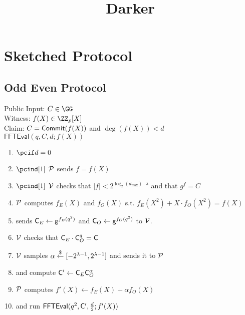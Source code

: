 \documentclass[12pt]{article}
\title{Darker}
\begin{document}
	
\maketitle
\section{Sketched Protocol}
\subsection{Odd Even Protocol}
\begin{mdframed}
Public Input: $C\in \GG$\\
Witness: $f(X) \in \ZZ_p[X]$ \\
Claim: $C=\textsf{{Commit}}(f(X))$ and $\deg(f(X))<d$	\\
$\textsf{FFTEval}(q,C,d;f(X))$
\begin{enumerate}[nolistsep]
		\item $\pcif d=0$
		\item $\pcind[1]$ $\mathcal{P}$ sends $f=f(X)$
		\item $\pcind[1]$ $\mathcal{V}$ checks that $|f|<2^{\log_2(d_{\max}) \cdot \lambda}$ and that $g^f=C$ 
		\item $\mathcal{P}$ computes $f_E(X)$ and $f_O(X)$ s.t. $f_E(X^2)+X \cdot f_O(X^2)=f(X)$ 
		\item \prover sends $\mathsf{C}_E\gets \mathsf{g}^{f_E(q^2)}$ and $\mathsf{C}_O\gets \mathsf{g}^{f_O(q^2)}$ to $\mathcal{V}$.
		\item $\mathcal{V}$ checks that $\mathsf{C}_E\cdot \mathsf{C}_O^q=\mathsf{C}$ 
		\item $\mathcal{V}$ samples $\alpha \overset{\$}{\gets} [-2^{\lambda-1},2^{\lambda-1}]$ and sends it to $\mathcal{P}$
		\item \prover and \verifier compute $\mathsf{C}'\gets \mathsf{C}_E\mathsf{C}_O^{\alpha}$
		\item $\mathcal{P}$ computes $f'(X)\gets f_E(X)+\alpha f_O(X)$
		\item \prover and \verifier run $\textsf{FFTEval}(q^2,\mathsf{C}',\frac{d}{2};f'(X))$
	\end{enumerate}
\end{mdframed}
\end{document}
